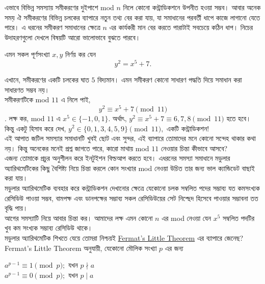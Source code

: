 \documentclass[11pt]{report}
\begin{document}
এভাবে বিভিন্ন সমস্যায় সমীকরণের দুইপাশে mod $n$ নিলে কোনো কন্ট্রাডিকশনে উপনীত হওয়া সম্ভব। আবার অনেক সময় ঐ সমীকরণের বিভিন্ন চলকের ব্যাপারে নতুন তথ্য বের করা যায়, যা সমাধানের পরবর্তী ধাপে কাজে লাগানো যেতে পারে। এ ধরনের সমীকরণ সমাধানের ক্ষেত্রে $n$ এর কার্যকরী মান বের করতে পারাটাই সবচেয়ে কঠিন ধাপ। নিচের উদাহরণগুলো দেখলে বিষয়টি আরো ভালোভাবে বুঝতে পারবে।\\

\begin{tcolorbox}[colframe=black!80!green,title=উদাহরণ 2.1.1]
এমন সকল পূর্ণসংখ্যা $x, y$ নির্ণয় কর যেন $$y^2 = x^5 + 7.$$
\end{tcolorbox}

এখানে, সমীকরণের একটি চলকের ঘাত $5$ বিদ্যমান। এমন সমীকরণ কোনো সাধারণ পদ্ধতি দিয়ে সমাধান করা সাধারণত সম্ভব নয়।\\

সমীকরণটিকে mod $11$ এ নিলে পাই, $$y^2 \equiv x^5 + 7 \pmod{11}$$.
লক্ষ কর, mod $11$ এ $x^5 \in \{-1, 0, 1\}.$ অর্থাৎ, $y^2 \equiv x^5 +7 \equiv 6, 7, 8 \pmod{11}$ হতে হবে। কিন্তু একটু হিসাব করে দেখ, $y^2 \in \{0, 1, 3, 4, 5, 9\} \pmod{11},$ একটি কন্ট্রাডিকশন!\\

এই আপাত জটিল সমস্যার সমাধানটি খুবই ছোট এবং সুন্দর, এই ব্যাপারে তোমাদের মনে কোনো সন্দেহ থাকার কথা নয়। কিন্তু অনেকের মনেই প্রশ্ন জাগতে পারে, কারো মাথায় mod $11$ নেওয়ার চিন্তা কীভাবে আসবে?\\

এজন্য তোমাকে প্রচুর অনুশীলন করে ইনটুইশন বিল্ডআপ করতে হবে। এধরনের সমস্যা সমাধানে মডুলার অ্যারিথমেটিকের কিছু বৈশিষ্ট্য নিয়ে চিন্তা করলে কোন সংখ্যার mod নেওয়া উচিত তার জন্য ভাল ক্যান্ডিডেট বাছাই করা যায়।\\

মডুলার অ্যারিথমেটিক ব্যবহার করে কন্ট্রাডিকশন দেখানোর ক্ষেত্রে যেকোনো চলক সম্বলিত পদের সম্ভাব্য যত কমসংখ্যক রেসিডিউ পাওয়া সম্ভব, বামপক্ষ এবং ডানপক্ষের সম্ভাব্য সকল রেসিডিউয়ের সেট নিশ্ছেদ হিসেবে পাওয়ার সম্ভাবনা তত বৃদ্ধি পায়।\\

আগের সমস্যাটি নিয়ে আবার চিন্তা কর। আমাদের লক্ষ এমন কোনো $n$ এর mod নেওয়া যেন $x^5$ সম্বলিত পদটির খুব কম সংখ্যক সম্ভাব্য রেসিডিউ থাকে।\\

মডুলার অ্যারিথমেটিক শিখতে যেয়ে তোমরা নিশ্চয়ই \href{https://en.wikipedia.org/wiki/Fermat%27s_little_theorem}{Fermat's Little Theorem} এর ব্যাপারে জেনেছ? Fermat's Little Theorem
অনুযায়ী, যেকোনো মৌলিক সংখ্যা $p$ এর জন্য

\begin{center}
$a^{p-1} \equiv 1 \pmod{p};$ যখন $p \nmid a$\\
$a^{p-1} \equiv 0 \pmod{p};$ যখন $p \mid a$
\end{center}
\end{document}
